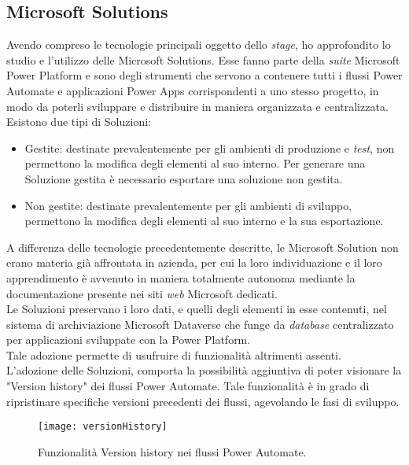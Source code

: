 \subsection{Microsoft Solutions}
Avendo compreso le tecnologie principali oggetto dello \emph{stage}, ho approfondito lo studio e l'utilizzo delle Microsoft Solutions.
Esse fanno parte della \emph{suite} Microsoft Power Platform e sono degli strumenti che servono a contenere tutti i flussi Power Automate e applicazioni Power Apps corrispondenti a uno stesso progetto, in modo da poterli sviluppare e distribuire in maniera organizzata e centralizzata.\\
Esistono due tipi di Soluzioni: 
\begin{itemize}
    \item Gestite: destinate prevalentemente per gli ambienti di produzione e \emph{test}, non permettono la modifica degli elementi al suo interno. Per generare una Soluzione gestita è necessario esportare una soluzione non gestita.
    \item Non gestite: destinate prevalentemente per gli ambienti di sviluppo, permettono la modifica degli elementi al suo interno e la sua esportazione.
\end{itemize}
A differenza delle tecnologie precedentemente descritte, le Microsoft Solution non erano materia già affrontata in azienda, per cui la loro individuazione e il loro apprendimento è avvenuto in maniera totalmente autonoma mediante la documentazione presente nei siti \emph{web} Microsoft dedicati.\\
Le Soluzioni preservano i loro dati, e quelli degli elementi in esse contenuti, nel sistema di archiviazione Microsoft Dataverse che funge da \emph{database} centralizzato per applicazioni sviluppate con la Power Platform.\\
Tale adozione permette di usufruire di funzionalità altrimenti assenti.\\
L'adozione delle Soluzioni, comporta la possibilità aggiuntiva di poter visionare la "Version history" dei flussi Power Automate. Tale funzionalità è in grado di ripristinare specifiche versioni precedenti dei flussi, agevolando le fasi di sviluppo.
\begin{figure}[htbp] 
    \centering 
    \texttt{[image: versionHistory]} 
    \caption{Funzionalità Version history nei flussi Power Automate.}
    \label{fig:versionHistory}
\end{figure}

